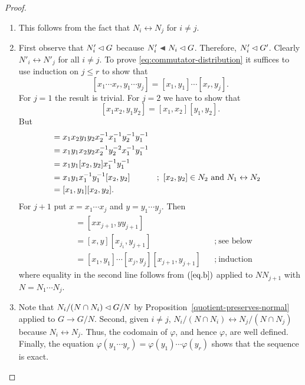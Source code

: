 \begin{proof}${}$
\begin{enumerate}[\upshape a)]
    \item This follows from the fact that $N_i\leftrightarrow N_j$ for $i\ne j$.

    \item First observe that $N_i'\lhd G$ because $N_i'\ch N_i\normal G$. Therefore, $N'_i\lhd G'$. Clearly $N'_i\leftrightarrow N'_j$ for all $i\ne j$. To prove \eqref{eq:commutator-distribution} it suffices to use induction on $j\le r$ to show that
    $$
        [x_1\cdots x_r,y_1\cdots y_j] = [x_1,y_1]\cdots[x_r,y_j].
    $$
    For $j=1$ the result is trivial. For $j=2$ we have to show that
    \begin{equation}\label{eq.b}
        [x_1x_2,y_1y_2]=[x_1,x_2][y_1,y_2].
    \end{equation}
    But
    \begin{align*}
        [x_1x_2,y_1y_2] &= x_1x_2y_1y_2x_2^{-1}x_1^{-1}y_2^{-1}y_1^{-1}\\
            &= x_1y_1x_2y_2x_2^{-1}y_2^{-2}x_1^{-1}y_1^{-1}\\
            &= x_1y_1[x_2,y_2]x_1^{-1}y_1^{-1}\\
            &= x_1y_1x_1^{-1}y_1^{-1}[x_2,y_2]
                &&;\ [x_2,y_2]\in N_2\text{ and }N_1\comm N_2\\
            &= [x_1,y_1][x_2,y_2].
    \end{align*}
    For $j+1$ put $x=x_1\cdots x_j$ and $y=y_1\cdots y_j$. Then
    \begin{align*}
        [x_1\cdots x_{j+1},y_1\cdots y_{j+1}]
            &= [xx_{j+1},yy_{j+1}]\\
            &= [x,y][x_{j_1},y_{j+1}]   &&;\ \text{see below}\\
            &= [x_1,y_1]\cdots[x_j,y_j][x_{j+1},y_{j+1}]   &&;\ \text{induction}
    \end{align*}
    where equality in the second line follows from $(\ref{eq.b})$ applied to $NN_{j+1}$ with $N=N_1\cdots N_j$.

    \item Note that $N_i/(N\cap N_i)\lhd G/N$ by Proposition~\ref{quotient-preserves-normal} applied to $G\to G/N$. Second, given $i\ne j$, $N_i/(N\cap N_i)\leftrightarrow N_j/(N\cap N_j)$ because $N_i\leftrightarrow N_j$. Thus, the codomain of $\varphi$, and hence $\varphi$, are well defined. Finally, the equation $\varphi(y_1\cdots y_r)=\varphi(y_1)\cdots\varphi(y_r)$ shows that the sequence is exact.


\end{enumerate}
\end{proof}
